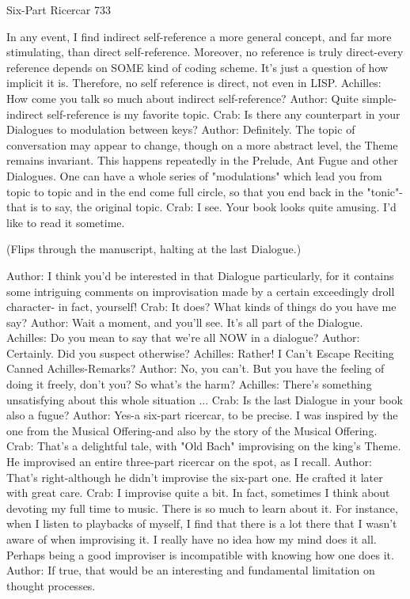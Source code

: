 Six-Part Ricercar                                                                       733

  In any event, I find indirect self-reference a more general concept, and far more
  stimulating, than direct self-reference. Moreover, no reference is truly direct-every
  reference depends on SOME kind of coding scheme. It's just a question of how
  implicit it is. Therefore, no self reference is direct, not even in LISP.
Achilles: How come you talk so much about indirect self-reference?
Author: Quite simple-indirect self-reference is my favorite topic.
Crab: Is there any counterpart in your Dialogues to modulation between keys?
Author: Definitely. The topic of conversation may appear to change, though on a more
  abstract level, the Theme remains invariant. This happens repeatedly in the Prelude,
  Ant Fugue and other Dialogues. One can have a whole series of "modulations" which
  lead you from topic to topic and in the end come full circle, so that you end back in the
  "tonic"-that is to say, the original topic.
Crab: I see. Your book looks quite amusing. I'd like to read it sometime.

   (Flips through the manuscript, halting at the last Dialogue.)

Author: I think you'd be interested in that Dialogue particularly, for it contains some
  intriguing comments on improvisation made by a certain exceedingly droll character-
  in fact, yourself!
Crab: It does? What kinds of things do you have me say?
Author: Wait a moment, and you'll see. It's all part of the Dialogue. Achilles: Do you
  mean to say that we're all NOW in a dialogue? Author: Certainly. Did you suspect
  otherwise?
Achilles: Rather! I Can't Escape Reciting Canned Achilles-Remarks? Author: No, you
  can't. But you have the feeling of doing it freely, don't
you? So what's the harm?
Achilles: There's something unsatisfying about this whole situation ... Crab: Is the last
  Dialogue in your book also a fugue?
Author: Yes-a six-part ricercar, to be precise. I was inspired by the one from the Musical
  Offering-and also by the story of the Musical Offering.
Crab: That's a delightful tale, with "Old Bach" improvising on the king's Theme. He
  improvised an entire three-part ricercar on the spot, as I recall.
Author: That's right-although he didn't improvise the six-part one. He crafted it later with
  great care.
Crab: I improvise quite a bit. In fact, sometimes I think about devoting my full time to
  music. There is so much to learn about it. For instance, when I listen to playbacks of
  myself, I find that there is a lot there that I wasn't aware of when improvising it. I
  really have no idea how my mind does it all. Perhaps being a good improviser is
  incompatible with knowing how one does it.
Author: If true, that would be an interesting and fundamental limitation on thought
  processes.




